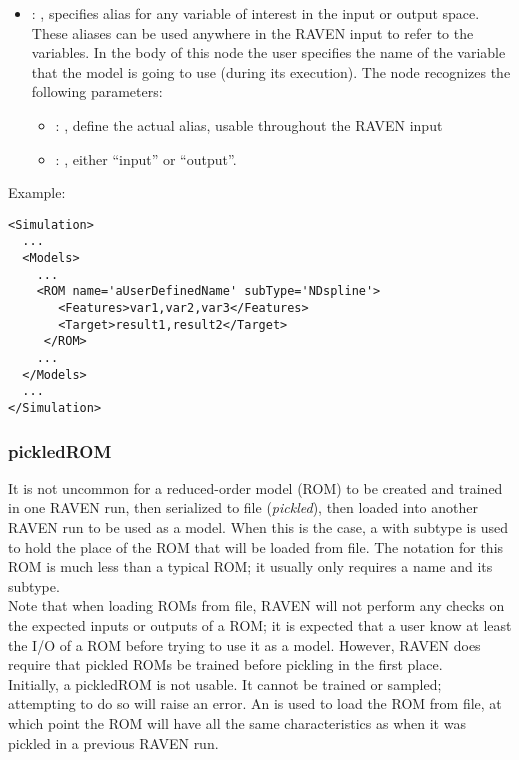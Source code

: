 \begin{itemize}
    \item {}: , 
      specifies alias for         any variable of interest in the input or output space. These
      aliases can be used anywhere in the RAVEN input to         refer to the variables. In the body
      of this node the user specifies the name of the variable that the model is going to use
      (during its execution).
      The  node recognizes the following parameters:
        \begin{itemize}
          \item {}: , 
            define the actual alias, usable throughout the RAVEN input
          \item {}: , 
            either ``input'' or ``output''.
      \end{itemize}
  \end{itemize}

\hspace{24pt}
Example:
\begin{lstlisting}[style=XML]
<Simulation>
  ...
  <Models>
    ...
    <ROM name='aUserDefinedName' subType='NDspline'>
       <Features>var1,var2,var3</Features>
       <Target>result1,result2</Target>
     </ROM>
    ...
  </Models>
  ...
</Simulation>
\end{lstlisting}


\subsubsection{pickledROM}
  It is not uncommon for a reduced-order model (ROM) to be created and trained in one RAVEN run,
  then     serialized to file (\emph{pickled}), then loaded into another RAVEN run to be used as a
  model.  When this is     the case, a  with subtype  is used to
  hold the place of the ROM that will     be loaded from file.  The notation for this ROM is much
  less than a typical ROM; it usually only requires a name and     its subtype.     \\     Note that
  when loading ROMs from file, RAVEN will not perform any checks on the expected inputs or outputs
  of     a ROM; it is expected that a user know at least the I/O of a ROM before trying to use it as
  a model.     However, RAVEN does require that pickled ROMs be trained before pickling in the first
  place.     \\     Initially, a pickledROM is not usable.  It cannot be trained or sampled;
  attempting to do so will raise an     error.  An  is used to load the ROM from
  file, at which point the ROM will have all the same     characteristics as when it was pickled in
  a previous RAVEN run.

